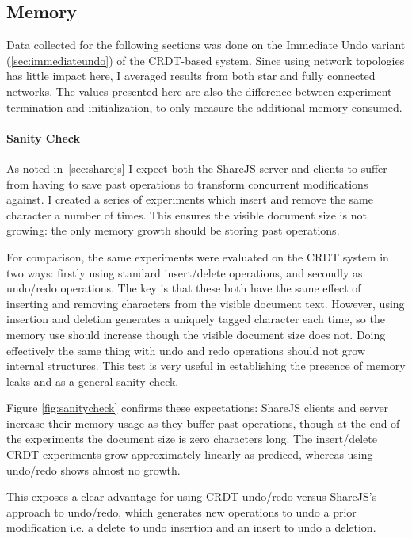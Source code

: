 \documentclass[12pt,a4paper,twoside,openright]{report}
\begin{document}
		
			
		\subsection{Memory}
			Data collected for the following sections was done on the Immediate Undo variant (\cref{sec:immediateundo}) of the CRDT-based system. Since using network topologies has little impact here, I averaged results from both star and fully connected networks. The values presented here are also the difference between experiment termination and initialization, to only measure the additional memory consumed.
		
			\paragraph{Sanity Check} \label{sec:sanitycheck}
				As noted in~\cref{sec:sharejs} I expect both the ShareJS server and clients to suffer from having to save past operations to transform concurrent modifications against. I created a series of experiments which insert and remove the same character a number of times. This ensures the visible document size is not growing: the only memory growth should be storing past operations. 
				
				For comparison, the same experiments were evaluated on the CRDT system in two ways: firstly using standard insert/delete operations, and secondly as undo/redo operations. The key is that these both have the same effect of inserting and removing characters from the visible document text. However, using insertion and deletion generates a uniquely tagged character each time, so the memory use should increase though the visible document size does not. Doing effectively the same thing with undo and redo operations should not grow internal structures. This test is very useful in establishing the presence of memory leaks and as a general sanity check.
				
				Figure \ref{fig:sanitycheck} confirms these expectations: ShareJS clients and server increase their memory usage as they buffer past operations, though at the end of the experiments the document size is zero characters long. The insert/delete CRDT experiments grow approximately linearly as prediced, whereas using undo/redo shows almost no growth. 
				
				This exposes a clear advantage for using CRDT undo/redo versus ShareJS's approach to undo/redo, which generates new operations to undo a prior modification i.e. a delete to undo insertion and an insert to undo a deletion. 
				
\end{document}
